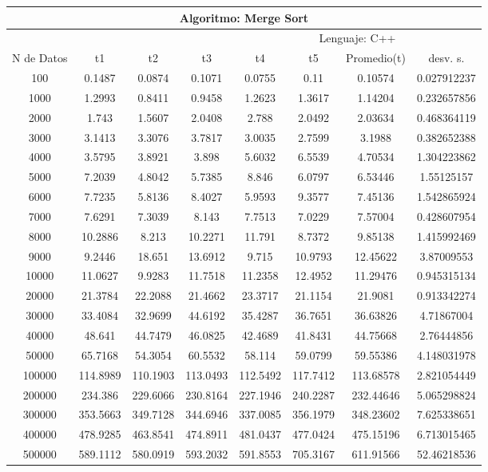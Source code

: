 \documentclass{article}
\begin{document}
    \begin{table}[]
        \begin{tabular}{|c|c|c|c|c|c|c|c| }
            \hline
            \multicolumn{8}{|c|}{Algoritmo: Merge Sort} \\ \hline
            \multicolumn{4}{|c|}{} & \multicolumn{4}{c|}{Lenguaje: C++} \\ \hline
              N de Datos &     t1    &  t2         &  t3          &   t4        &    t5     &   Promedio(t)       & desv. s. \\ \hline
100	    &0.1487	&0.0874	&0.1071	&0.0755	&0.11	&0.10574	&0.027912237\\ \hline
1000	&1.2993	&0.8411	&0.9458	&1.2623	&1.3617	&1.14204	&0.232657856\\ \hline
2000	&1.743	&1.5607	&2.0408	&2.788	&2.0492	&2.03634	&0.468364119\\ \hline
3000	&3.1413	&3.3076	&3.7817	&3.0035	&2.7599	&3.1988	&0.382652388\\ \hline
4000	&3.5795	&3.8921	&3.898	&5.6032	&6.5539	&4.70534	&1.304223862\\ \hline
5000	&7.2039	&4.8042	&5.7385	&8.846	&6.0797	&6.53446	&1.55125157\\ \hline
6000	&7.7235	&5.8136	&8.4027	&5.9593	&9.3577	&7.45136	&1.542865924\\ \hline
7000	&7.6291	&7.3039	&8.143	&7.7513	&7.0229	&7.57004	&0.428607954\\ \hline
8000	&10.2886	&8.213	&10.2271	&11.791	&8.7372	&9.85138	&1.415992469\\ \hline
9000	&9.2446	&18.651	&13.6912	&9.715	&10.9793	&12.45622	&3.87009553\\ \hline
10000	&11.0627	&9.9283	&11.7518	&11.2358	&12.4952	&11.29476	&0.945315134\\ \hline
20000	&21.3784	&22.2088	&21.4662	&23.3717	&21.1154	&21.9081	&0.913342274\\ \hline
30000	&33.4084	&32.9699	&44.6192	&35.4287	&36.7651	&36.63826	&4.71867004\\ \hline
40000	&48.641	&44.7479	&46.0825	&42.4689	&41.8431	&44.75668	&2.76444856\\ \hline
50000	&65.7168	&54.3054	&60.5532	&58.114	&59.0799	&59.55386	&4.148031978\\ \hline
100000	&114.8989	&110.1903	&113.0493	&112.5492	&117.7412	&113.68578	&2.821054449\\ \hline
200000	&234.386	    & 229.6066	&230.8164	&227.1946	&240.2287	&232.44646	&5.065298824\\ \hline
300000	&353.5663	&349.7128	&344.6946	&337.0085	&356.1979	&348.23602	&7.625338651\\ \hline
400000	&478.9285	&463.8541	&474.8911	&481.0437	&477.0424	&475.15196	&6.713015465\\ \hline
500000	&589.1112	&580.0919	&593.2032	&591.8553	&705.3167	&611.91566	&52.46218536\\ \hline
        \end{tabular}
    \end{table}
\end{document}
